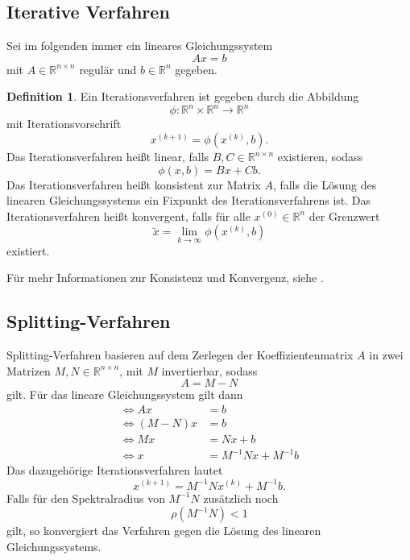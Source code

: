 \documentclass{scrartcl}
\newcommand\R{\mathbb{R}}
\theoremstyle{definition}
\newtheorem{definition}{Definition}
\begin{document}
\subsection{Iterative Verfahren}
Sei im folgenden immer ein lineares Gleichungssystem
\[Ax=b\]
mit \(A \in \R^{n \times n}\) regulär und \(b \in \R^n\) gegeben.
\begin{definition}\cite[p.~69-70]{Iterative}
    Ein Iterationsverfahren ist gegeben durch die Abbildung
    \[\phi:\R^n \times \R^n \rightarrow \R^n\]
    mit Iterationsvorschrift
    \[x^{(k+1)}=\phi(x^{(k)},b).\]
    Das Iterationsverfahren heißt linear, falls \(B,C \in \R^{n \times n}\)
    existieren, sodass
    \[\phi(x,b)=Bx+Cb.\]
    Das Iterationsverfahren heißt konsistent zur Matrix \(A\), falls die Lösung des linearen Gleichungssystems ein Fixpunkt des Iterationsverfahrens ist.
    Das Iterationsverfahren heißt konvergent, falls für alle \(x^{(0)} \in \R^n\) der Grenzwert
    \[\tilde{x} = \lim_{k \to \infty} \phi(x^{(k)},b)\] existiert.
\end{definition}
Für mehr Informationen zur Konsistenz und Konvergenz, siehe \cite[p.~71-72]{Iterative}.



\subsection{Splitting-Verfahren}
Splitting-Verfahren basieren auf dem Zerlegen der Koeffizientenmatrix \(A\) in
zwei Matrizen \(M, N \in \R^{n \times n}\), mit \(M\) invertierbar, sodass
\[A = M-N\]
gilt. Für das lineare Gleichungssystem gilt dann
\begin{align*}
    \iff Ax     & = b                  \\
    \iff (M-N)x & = b                  \\
    \iff Mx     & = Nx + b             \\
    \iff x      & = M^{-1}Nx + M^{-1}b
\end{align*}
Das dazugehörige Iterationsverfahren lautet\cite[p.~165]{SOR}
\[x^{(k+1)}= M^{-1}Nx^{(k)} + M^{-1}b.\]
Falls für den Spektralradius von \(M^{-1}N\) zusätzlich noch
\[\rho(M^{-1}N)<1\]
gilt, so konvergiert das Verfahren gegen die Lösung des linearen Gleichungssystems\cite[p.~73-74]{Iterative}.
\end{document}
